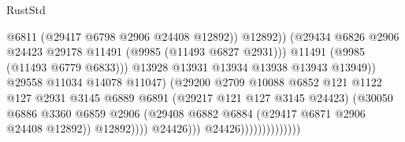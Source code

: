 \begin{lexlean}{RustStd}
\begin{coremodule}
                                                        @6811
                                                        (@29417 @6798 @2906 @24408 @12892))
                                                      @12892))
                                                  (@29434
                                                    @6826
                                                    @2906
                                                    @24423
                                                    @29178
                                                    @11491
                                                    (@9985 (@11493 @6827 @2931)))
                                                  @11491
                                                  (@9985 (@11493 @6779 @6833)))
                                                @13928
                                                @13931
                                                @13934
                                                @13938
                                                @13943
                                                @13949))
                                            @29558
                                            @11034
                                            @14078
                                            @11047)
                                          (@29200
                                            @2709
                                            @10088
                                            @6852
                                            @121
                                            @1122
                                            @127
                                            @2931
                                            @3145
                                            @6889
                                            @6891
                                            (@29217 @121 @127 @3145 @24423)
                                            (@30050
                                              @6886
                                              @3360
                                              @6859
                                              @2906
                                              (@29408
                                                @6882
                                                @6884
                                                (@29417 @6871 @2906 @24408 @12892))
                                              @12892))))
                                      @24426)))
                                @24426))))))))))))))

\end{coremodule}
\end{lexlean}
